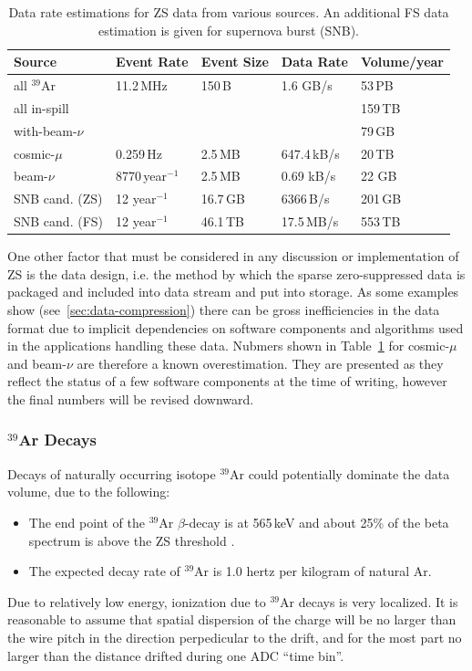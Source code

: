 \begin{table}[ht!]
\centering
\begin{tabular}{| p{1.2in} | p{0.9in} | p{0.75in} | p{1in} | p{0.9in} |}		\hline		
Source & Event Rate & Event Size & Data Rate & Volume/year \\ \hline
all $^{39}$Ar & 11.2\,MHz & 150\,B & 1.6 GB/s &  53\,PB \\ \hline
all in-spill & & & & 159\,TB \\ \hline
with-beam-$\nu$ & & & & 79\,GB \\ \hline
cosmic-$\mu$ & 0.259\,Hz &2.5\,MB & 647.4\,kB/s & 20\,TB \\	\hline
beam-$\nu$ & 8770\,year$^{-1}$ & 2.5\,MB & 0.69 kB/s & 22 GB \\ \hline
SNB cand. (ZS) & 12 year$^{-1}$ & 16.7\,GB & 6366\,B/s & 201\,GB \\ \hline
SNB cand. (FS) & 12 year$^{-1}$ & 46.1\,TB & 17.5\,MB/s & 553\,TB \\ \hline
\end{tabular}
\caption{Data rate estimations for ZS data from various sources.
An additional FS data estimation is given for supernova burst (SNB).}
\label{tab:zs-volume}
\end{table}
\noindent
One other factor that must be considered in any discussion or implementation of ZS is the data design,
i.e. the method by which the sparse zero-suppressed data is packaged and included into
data stream and put into storage. As some examples show (see~\ref{sec:data-compression})
there can be gross inefficiencies in the data format due to implicit dependencies
on software components and algorithms used in the applications handling these data.
Nubmers shown in Table~\ref{tab:zs-volume} for cosmic-$\mu$ and beam-$\nu$
are therefore a known overestimation. They are presented as they reflect the status
of a few software components at the time of writing, however the final numbers
will be revised downward.


\subsubsection{$^{39}$Ar Decays}
\label{sec:ar39decays}
Decays of naturally occurring isotope $^{39}$Ar could potentially dominate the data volume,
due to the following:
\begin{itemize}
\item The end point of the $^{39}$Ar $\beta$-decay is at 565\,keV and about
25\% of the beta spectrum is above the ZS threshold \cite{ar39endpoint}.

\item The expected decay rate of $^{39}$Ar is 1.0 hertz per kilogram of natural Ar\cite{ar39bkg}.
\end{itemize}
\noindent
Due to relatively low energy, ionization due to $^{39}$Ar decays is very localized.
It is reasonable to assume that spatial dispersion of the charge will be no larger than the wire pitch
in the direction perpedicular to the drift, and for the most part no larger than the distance drifted
during one ADC ``time bin''.

